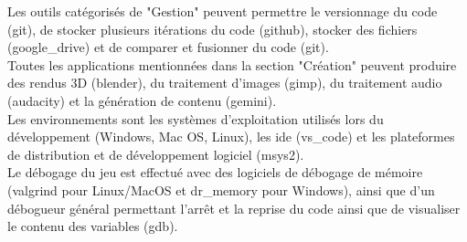\documentclass[11pt, a4paper]{article}
\begin{document}
    Les outils catégorisés de "Gestion" peuvent permettre le versionnage du code (\Gls{git}\cite{bib_git}), de stocker plusieurs itérations du code (\Gls{github}), stocker des fichiers (\Gls{google_drive}\cite{bib_drive}) et de comparer et fusionner du code (\Gls{git}).\\

    Toutes les applications mentionnées dans la section "Création" peuvent produire des rendus 3D (\Gls{blender}\cite{bib_blender}), du traitement d'images (\Gls{gimp}\cite{bib_gimp}), du traitement audio (\Gls{audacity}\cite{bib_audacity}) et la génération de contenu (\Gls{gemini}\cite{bib_gemini}).\\

    Les environnements sont les systèmes d'exploitation utilisés lors du développement (Windows, Mac OS, Linux), les \acrshort{ide} (\Gls{vs_code}\cite{bib_vscode}) et les plateformes de distribution et de développement logiciel (\Gls{msys2}\cite{bib_msys2}).\\

    Le débogage du jeu est effectué avec des logiciels de débogage de mémoire (\Gls{valgrind}\cite{bib_valgrind} pour Linux/MacOS et \Gls{dr_memory}\cite{bib_dr_memory} pour Windows), ainsi que d'un débogueur général permettant l'arrêt et la reprise du code ainsi que de visualiser le contenu des variables (\Gls{gdb}\cite{bib_gdb}).\\
\end{document}
